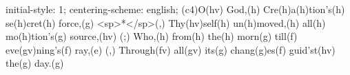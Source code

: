 initial-style: 1;
centering-scheme: english;
(c4)O(hv) God,(h) Cre(h)a(h)tion's(h) se(h)cret(h) force,(g) <sp>*</sp>(,)
Thy(hv)self(h) un(h)moved,(h) all(h) mo(h)tion's(g) source,(hv) (;)
Who,(h) from(h) the(h) morn(g) till(f) eve(gv)ning's(f) ray,(e) (,)
Through(fv) all(gv) its(g) chang(g)es(f) guid'st(hv) the(g) day.(g)
